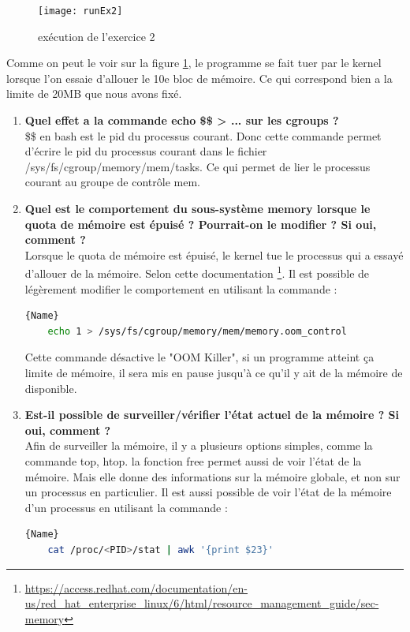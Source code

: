 \documentclass[
	a4paper, %
	10pt, %
]{CSUniSchoolLabReport}
\begin{document}
\begin{figure}[H]
	\centering
	\texttt{[image: runEx2]}
	\caption{ex\'ecution de l'exercice 2}
	\label{fig:ex2}
\end{figure}

Comme on peut le voir sur la figure \ref{fig:ex2}, le programme se fait tuer par le kernel lorsque l'on essaie d'allouer le 10e bloc de m\'emoire.
Ce qui correspond bien a la limite de 20MB que nous avons fixé.

\begin{enumerate}[label=\textbf{\arabic*}]
	\item \textbf{Quel effet a la commande echo \$\$ > ... sur les cgroups ?}\\
\$\$ en bash est le pid du processus courant. Donc cette commande permet d'écrire le pid du processus courant dans le fichier /sys/fs/cgroup/memory/mem/tasks. Ce qui permet de lier le processus courant au groupe de contr\^ole mem.
	
	\item \textbf{Quel est le comportement du sous-système memory lorsque le quota de mémoire est épuisé ? Pourrait-on le modifier ? Si oui, comment ?}\\
Lorsque le quota de m\'emoire est \'epuisé, le kernel tue le processus qui a essayé d'allouer de la m\'emoire.
Selon cette documentation \footnote{\href{https://access.redhat.com/documentation/en-us/red_hat_enterprise_linux/6/html/resource_management_guide/sec-memory}{https://access.redhat.com/documentation/en-us/red\_hat\_enterprise\_linux/6/html/resource\_management\_guide/sec-memory}}.
Il est possible de l\'eg\`erement modifier le comportement en utilisant la commande :
\begin{lstlisting}[language=bash, firstnumber=1]{Name}
	echo 1 > /sys/fs/cgroup/memory/mem/memory.oom_control
\end{lstlisting}
Cette commande d\'esactive le "OOM Killer", si un programme atteint ça limite de m\'emoire, il sera mis en pause jusqu'\`a ce qu'il y ait de la m\'emoire de disponible.

	\item \textbf{Est-il possible de surveiller/vérifier l’état actuel de la mémoire ? Si oui, comment ?}\\
Afin de surveiller la m\'emoire, il y a plusieurs options simples, comme la commande top, htop.
la fonction free permet aussi de voir l'\'etat de la m\'emoire. Mais elle donne des informations sur la m\'emoire globale, et non sur un processus en particulier.
Il est aussi possible de voir l'\'etat de la m\'emoire d'un processus en utilisant la commande :
\begin{lstlisting}[language=bash, firstnumber=1]{Name}
	cat /proc/<PID>/stat | awk '{print $23}'
\end{lstlisting}
\end{enumerate}
\end{document}
